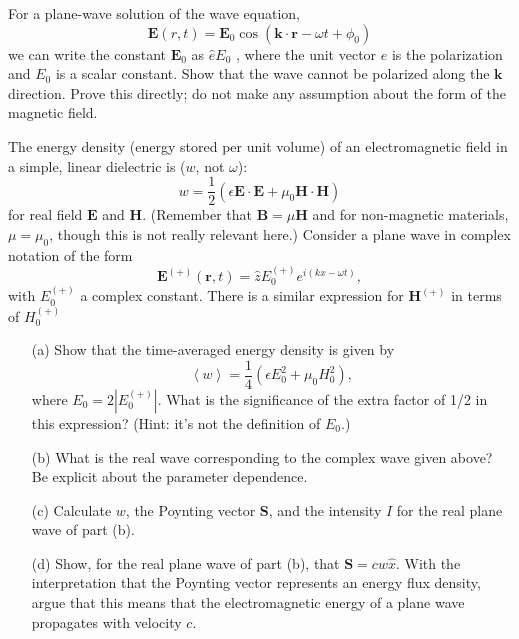\documentclass[11pt]{hmcpset}
\begin{document}
\begin{problem}
	For a plane-wave solution of the wave equation,
	\[
	\mathbf{E}(r,t) = \mathbf{E}_0 \cos(\mathbf{k} \cdot  \mathbf{r} - \omega t + \phi_0 )
	\]
	we can write the constant $\mathbf{E}_0$ as $\hat e E_0$ , where the unit vector $\hat e$ is the polarization and $E_0$ is a scalar constant. Show that the wave cannot be polarized along the $\mathbf{k}$ direction. Prove this directly; do not make any assumption about the form of the magnetic field.
	
\end{problem}

\begin{solution}
	
	\vfill
	
\end{solution}
	\pagebreak
\begin{problem}
	The energy density (energy stored per unit volume) of an electromagnetic field in a simple, linear
	dielectric is ($w$, not $\omega$):
	\[
	w = \frac{1}{2} \left( \epsilon \mathbf{E} \cdot \mathbf{E} + \mu_0 \mathbf{H} \cdot \mathbf{H} \right)
	\]
	for real field $\mathbf{E}$ and $\mathbf{H}$. (Remember that $\mathbf{B}=\mu \mathbf{H}$ and for non-magnetic materials, $\mu=\mu_0$, though this is not really relevant here.)
	Consider a plane wave in complex notation of the form
	\[
	\mathbf{E}^{(+)}(\mathbf{r},t) = \hat z E_0^{(+)} e^{i(k x-\omega t)},
	\]
	with $E_0^{(+)}$ a complex constant. There is a similar expression for $\mathbf{H}^{(+)}$ in terms of $H_0^{(+)}$
	\begin{itemize}
		\item[(a)] Show that the time-averaged energy density is given by
		\[
		\left< w \right> = \frac{1}{4} \left( \epsilon E_0^2 + \mu_0 H_0^2 \right),
		\]
		where $E_0=2|E_0^{(+)}|$. What is the significance of the extra factor of 1/2 in this expression? (Hint: it's not the definition of $E_0$.)
		\item[(b)] What is the real wave corresponding to the complex wave given above? Be explicit about the
		parameter dependence.
		\item[(c)] Calculate $w$, the Poynting vector $\mathbf{S}$, and the intensity $I$ for the real plane wave of part (b).
		\item[(d)] Show, for the real plane wave of part (b), that $\mathbf{S} = c w \hat x$. With the interpretation that the Poynting vector represents an energy flux density, argue that this means that the electromagnetic energy of a plane wave propagates with velocity $c$.
	\end{itemize}
\end{problem}
\end{document}
